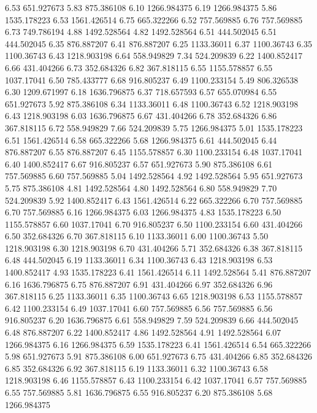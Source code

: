 6.53 	651.927673
5.83 	875.386108
6.10 	1266.984375
6.19 	1266.984375
5.86 	1535.178223
6.53 	1561.426514
6.75 	665.322266
6.52 	757.569885
6.76 	757.569885
6.73 	749.786194
4.88 	1492.528564
4.82 	1492.528564
6.51 	444.502045
6.51 	444.502045
6.35 	876.887207
6.41 	876.887207
6.25 	1133.36011
6.37 	1100.36743
6.35 	1100.36743
6.43 	1218.903198
6.64 	558.949829
7.34 	524.209839
6.22 	1400.852417
6.66 	431.404266
6.73 	352.684326
6.82 	367.818115
6.55 	1155.578857
6.55 	1037.17041
6.50 	785.433777
6.68 	916.805237
6.49 	1100.233154
5.49 	806.326538
6.30 	1209.671997
6.18 	1636.796875
6.37 	718.657593
6.57 	655.070984
6.55 	651.927673
5.92 	875.386108
6.34 	1133.36011
6.48 	1100.36743
6.52 	1218.903198
6.43 	1218.903198
6.03 	1636.796875
6.67 	431.404266
6.78 	352.684326
6.86 	367.818115
6.72 	558.949829
7.66 	524.209839
5.75 	1266.984375
5.01 	1535.178223
6.51 	1561.426514
6.58 	665.322266
5.68 	1266.984375
6.61 	444.502045
6.44 	876.887207
6.55 	876.887207
6.45 	1155.578857
6.30 	1100.233154
6.48 	1037.17041
6.40 	1400.852417
6.67 	916.805237
6.57 	651.927673
5.90 	875.386108
6.61 	757.569885
6.60 	757.569885
5.04 	1492.528564
4.92 	1492.528564
5.95 	651.927673
5.75 	875.386108
4.81 	1492.528564
4.80 	1492.528564
6.80 	558.949829
7.70 	524.209839
5.92 	1400.852417
6.43 	1561.426514
6.22 	665.322266
6.70 	757.569885
6.70 	757.569885
6.16 	1266.984375
6.03 	1266.984375
4.83 	1535.178223
6.50 	1155.578857
6.60 	1037.17041
6.70 	916.805237
6.50 	1100.233154
6.60 	431.404266
6.50 	352.684326
6.70 	367.818115
6.10 	1133.36011
6.00 	1100.36743
5.50 	1218.903198
6.30 	1218.903198
6.70 	431.404266
5.71 	352.684326
6.38 	367.818115
6.48 	444.502045
6.19 	1133.36011
6.34 	1100.36743
6.43 	1218.903198
6.53 	1400.852417
4.93 	1535.178223
6.41 	1561.426514
6.11 	1492.528564
5.41 	876.887207
6.16 	1636.796875
6.75 	876.887207
6.91 	431.404266
6.97 	352.684326
6.96 	367.818115
6.25 	1133.36011
6.35 	1100.36743
6.65 	1218.903198
6.53 	1155.578857
6.42 	1100.233154
6.49 	1037.17041
6.60 	757.569885
6.56 	757.569885
6.56 	916.805237
6.20 	1636.796875
6.61 	558.949829
7.59 	524.209839
6.66 	444.502045
6.48 	876.887207
6.22 	1400.852417
4.86 	1492.528564
4.91 	1492.528564
6.07 	1266.984375
6.16 	1266.984375
6.59 	1535.178223
6.41 	1561.426514
6.54 	665.322266
5.98 	651.927673
5.91 	875.386108
6.00 	651.927673
6.75 	431.404266
6.85 	352.684326
6.85 	352.684326
6.92 	367.818115
6.19 	1133.36011
6.32 	1100.36743
6.58 	1218.903198
6.46 	1155.578857
6.43 	1100.233154
6.42 	1037.17041
6.57 	757.569885
6.55 	757.569885
5.81 	1636.796875
6.55 	916.805237
6.20 	875.386108
5.68 	1266.984375

